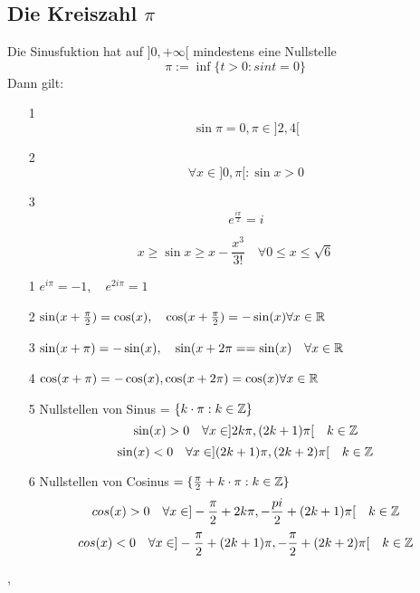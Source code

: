 \subsection{Die Kreiszahl \( \pi \)}
 Die Sinusfuktion hat auf \(]0,+ \infty [\) mindestens eine Nullstelle
\[ \pi := \inf\{t > 0 : sin t = 0\}\]
Dann gilt:
\begin{enumerate}
    \item [1] \[ \sin \pi = 0, \pi \in ]2,4[\]
    \item [2] \[ \forall x \in ]0,\pi [: \sin x > 0\]
    \item [3] \[ e^\frac{i \pi}{2} = i\]
\end{enumerate}
\[ x \geq \sin x \geq x - \frac{x^3}{3!} \quad \forall 0 \leq x \leq \sqrt{6}\]
\begin{enumerate}
    \item [1] \(e^{i \pi} = -1, \quad e^{2 i \pi} = 1\)
    \item [2] \( \sin(x + \frac{\pi}{2}) = \cos(x), \quad \cos(x + \frac{\pi}{2}) = -  \sin(x) \forall x \in \mathbb{R}\)
    \item [3] \( \sin(x + \pi ) = - \sin(x), \quad \sin(x + 2 \pi= =  \sin(x) \quad \forall x \in \mathbb{R} \)
    \item [4] \( \cos (x + \pi) = - \cos(x), \cos(x + 2 \pi) = \cos(x) \forall x \in \mathbb{R} \)
    \item [5] Nullstellen von Sinus = \(\{ k \cdot \pi : k \in \mathbb{Z}\}\)
    \[ \sin(x) > 0 \quad \forall x \in ]2k \pi, (2k + 1) \pi [ \quad k \in \mathbb{Z}\]
    \[ \sin(x) < 0 \quad \forall x \in ](2k+1) \pi, (2k + 2) \pi [ \quad k \in \mathbb{Z}\]
    \item [6] Nullstellen von Cosinus \(= \{ \frac{\pi}{2} + k \cdot \pi : k \in \mathbb{Z} \}\)
    \[ cos(x) > 0 \quad \forall x \in ] -\frac{\pi}{2} + 2k \pi, -\frac{pi}{2} + (2k+1) \pi [ \quad k \in \mathbb{Z}\]
    \[ cos(x) < 0 \quad \forall x \in ] -\frac{\pi}{2} + (2k+1) \pi, -\frac{\pi}{2} + (2k + 2) \pi[ \quad k \in \mathbb{Z}\]
\end{enumerate}
\sep
